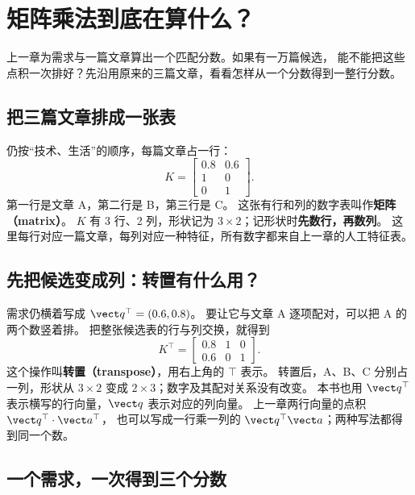 \chapterrule
\section{矩阵乘法到底在算什么？}
\label{intro:03-matrix-multiplication}

上一章为需求与一篇文章算出一个匹配分数。如果有一万篇候选，
能不能把这些点积一次排好？先沿用原来的三篇文章，看看怎样从一个分数得到一整行分数。

\subsection{把三篇文章排成一张表}
\label{concept:matrix}

仍按“技术、生活”的顺序，每篇文章占一行：
\[
K=\begin{bmatrix}0.8&0.6\\1&0\\0&1\end{bmatrix}.
\]
第一行是文章 A，第二行是 B，第三行是 C。
这张有行和列的数字表叫作\textbf{矩阵（matrix）}。
$K$ 有 3 行、2 列，形状记为 $3\times2$；记形状时\textbf{先数行，再数列}。
这里每行对应一篇文章，每列对应一种特征，所有数字都来自上一章的人工特征表。

\subsection{先把候选变成列：转置有什么用？}
\label{sec:layout-matrix-card}
\label{concept:transpose}

需求仍横着写成 $\vect q^\top=(0.6,0.8)$。
要让它与文章 A 逐项配对，可以把 A 的两个数竖着排。
把整张候选表的行与列交换，就得到
\[
K^\top=\begin{bmatrix}0.8&1&0\\0.6&0&1\end{bmatrix}.
\]
这个操作叫\textbf{转置（transpose）}，用右上角的 $\top$ 表示。
转置后，A、B、C 分别占一列，形状从 $3\times2$ 变成 $2\times3$；数字及其配对关系没有改变。
本书也用 $\vect q^\top$ 表示横写的行向量，$\vect q$ 表示对应的列向量。
上一章两行向量的点积 $\vect q^\top\cdot\vect a^\top$，
也可以写成一行乘一列的 $\vect q^\top\vect a$；两种写法都得到同一个数。



\subsection{一个需求，一次得到三个分数}

